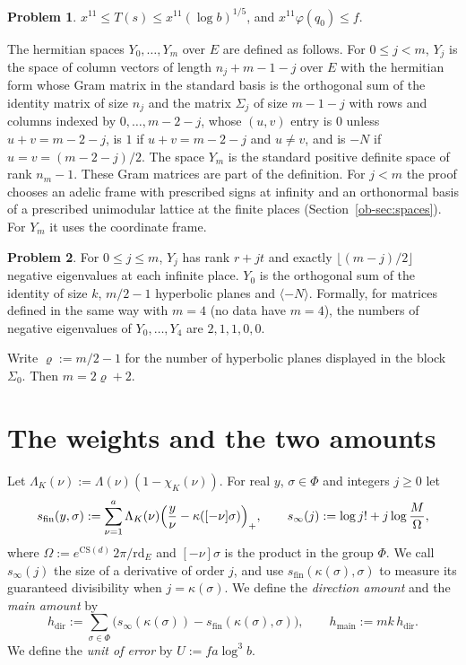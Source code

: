 \documentclass[reqno]{amsart}
\theoremstyle{plain}
\theoremstyle{definition}
\newtheorem{problem}{Problem}[section]
\newcommand{\rd}{\mathrm{rd}}
\newcommand{\CS}{\mathrm{CS}}
\newcommand{\hdir}{h_{\mathrm{dir}}}
\newcommand{\sfin}{s_{\mathrm{fin}}}
\newcommand{\hmain}{h_{\mathrm{main}}}
\begin{document}
\begin{problem}\label{pr:T}
\(x^{11} \le T(s) \le x^{11} (\log b)^{1/5}\), and \(x^{11} \varphi(q_0) \le f\).
\end{problem}

The hermitian spaces \(Y_0,\dots,Y_m\) over \(E\) are defined as follows.  For \(0 \le j < m\), \(Y_j\) is the space of column vectors of length \(n_j + m - 1 - j\) over \(E\) with the hermitian form whose Gram matrix in the standard basis is the orthogonal sum of the identity matrix of size \(n_j\) and the matrix \(\Sigma_j\) of size \(m - 1 - j\) with rows and columns indexed by \(0, \dots, m - 2 - j\), whose \((u, v)\) entry is \(0\) unless \(u + v = m - 2 - j\), is \(1\) if \(u + v = m - 2 - j\) and \(u \ne v\), and is \(-N\) if \(u = v = (m - 2 - j)/2\).  The space \(Y_m\) is the standard positive definite space of rank \(n_m - 1\).  These Gram matrices are part of the definition.  For \(j < m\) the proof chooses an adelic frame with prescribed signs at infinity and an orthonormal basis of a prescribed unimodular lattice at the finite places (Section~\ref{ob-sec:spaces}).  For \(Y_m\) it uses the coordinate frame.

\begin{problem}\label{pr:signs}
For \(0 \le j \le m\), \(Y_j\) has rank \(r + jt\) and exactly \(\lfloor (m - j)/2 \rfloor\) negative eigenvalues at each infinite place.  \(Y_0\) is the orthogonal sum of the identity of size \(k\), \(m/2 - 1\) hyperbolic planes and \(\langle -N \rangle\).  Formally, for matrices defined in the same way with \(m = 4\) (no data have \(m = 4\)), the numbers of negative eigenvalues of \(Y_0, \dots, Y_4\) are \(2, 1, 1, 0, 0\).
\end{problem}

Write \(\varrho := m/2 - 1\) for the number of hyperbolic planes displayed in the block \(\Sigma_0\).  Then \(m = 2\varrho + 2\).

\section{The weights and the two amounts}\label{sec:amounts}

Let \(\Lambda_K(\nu) := \Lambda(\nu)(1 - \chi_K(\nu))\).  For real \(y\), \(\sigma \in \Phi\) and integers \(j \ge 0\) let
\[
  \sfin(y, \sigma) := \sum_{\nu = 1}^{a} \Lambda_K(\nu) \Bigl(\frac y\nu - \kappa([-\nu]\sigma)\Bigr)_+ ,
  \qquad
  s_\infty(j) := \log j! + j \log \frac M\Omega ,
\]
where \(\Omega := e^{\CS(d)}\, 2\pi/\rd_E\) and \([-\nu]\sigma\) is the product in the group \(\Phi\).  We call \(s_\infty(j)\) the size of a derivative of order \(j\), and use \(\sfin(\kappa(\sigma),\sigma)\) to measure its guaranteed divisibility when \(j=\kappa(\sigma)\).  We define the \emph{direction amount} and the \emph{main amount} by
\[
  \hdir := \sum_{\sigma \in \Phi} \bigl( s_\infty(\kappa(\sigma)) - \sfin(\kappa(\sigma), \sigma) \bigr),
  \qquad
  \hmain := m k\, \hdir .
\]
We define the \emph{unit of error} by \(U := f a \log^3 b\).
\end{document}
